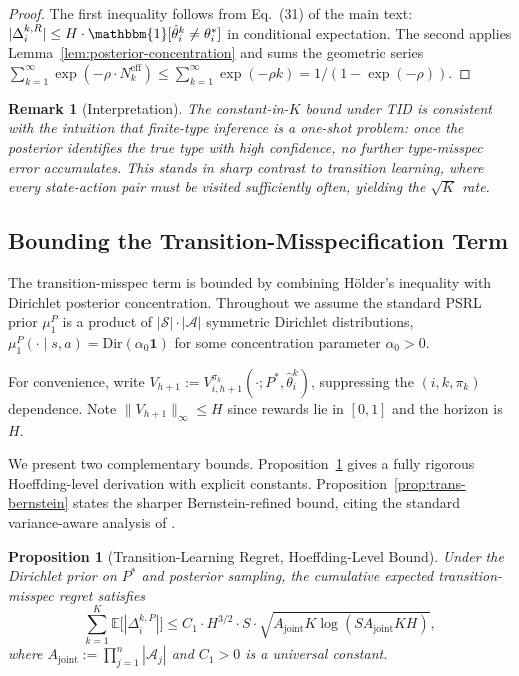 \documentclass{article}
\newtheorem{proposition}[theorem]{Proposition}
\newtheorem{remark}[theorem]{Remark}
\begin{document}
\begin{proof}
The first inequality follows from Eq.~(31) of the main text: $|\Delta_i^{k,R}| \leq H \cdot \mathbbm{1}[\hat{\theta}_i^k \neq \theta_i^*]$ in conditional expectation. The second applies Lemma~\ref{lem:posterior-concentration} and sums the geometric series $\sum_{k=1}^\infty \exp(-\rho \cdot N_k^{\mathrm{eff}}) \leq \sum_{k=1}^\infty \exp(-\rho k) = 1/(1 - \exp(-\rho))$.
\end{proof}

\begin{remark}[Interpretation]
The constant-in-$K$ bound under TID is consistent with the intuition that finite-type inference is a one-shot problem: once the posterior identifies the true type with high confidence, no further type-misspec error accumulates. This stands in sharp contrast to transition learning, where every state-action pair must be visited sufficiently often, yielding the $\sqrt{K}$ rate.
\end{remark}

\subsection{Bounding the Transition-Misspecification Term}

The transition-misspec term is bounded by combining Hölder's inequality with Dirichlet posterior concentration. Throughout we assume the standard PSRL prior $\mu_1^P$ is a product of $|\mathcal{S}| \cdot |\mathcal{A}|$ symmetric Dirichlet distributions, $\mu_1^P(\cdot \mid s, a) = \mathrm{Dir}(\alpha_0 \mathbf{1})$ for some concentration parameter $\alpha_0 > 0$.

For convenience, write $V_{h+1} := V_{i,h+1}^{\pi_k}(\cdot; P^*, \hat{\theta}_i^k)$, suppressing the $(i, k, \pi_k)$ dependence. Note $\|V_{h+1}\|_\infty \leq H$ since rewards lie in $[0, 1]$ and the horizon is $H$.

We present two complementary bounds. Proposition~\ref{prop:trans-hoeffding} gives a fully rigorous Hoeffding-level derivation with explicit constants. Proposition~\ref{prop:trans-bernstein} states the sharper Bernstein-refined bound, citing the standard variance-aware analysis of \citet{lu2019information,azar2017minimax}.

\begin{proposition}[Transition-Learning Regret, Hoeffding-Level Bound]
\label{prop:trans-hoeffding}
Under the Dirichlet prior on $P^*$ and posterior sampling, the cumulative expected transition-misspec regret satisfies
\begin{equation}
\label{eq:trans-hoeffding}
\sum_{k=1}^K \mathbb{E}\big[|\Delta_i^{k,P}|\big] \leq C_1 \cdot H^{3/2} \cdot S \cdot \sqrt{A_{\mathrm{joint}} K \log(SA_{\mathrm{joint}}KH)},
\end{equation}
where $A_{\mathrm{joint}} := \prod_{j=1}^n |\mathcal{A}_j|$ and $C_1 > 0$ is a universal constant.
\end{proposition}
\end{document}
